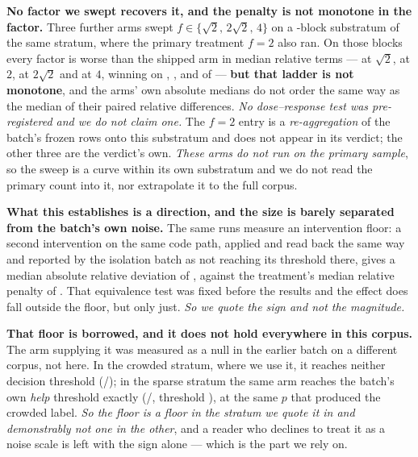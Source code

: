 \documentclass[review]{elsarticle}
\begin{document}
\textbf{No factor we swept recovers it, and the penalty is not monotone in the
factor.} Three further arms swept $f \in \{\sqrt{2},\, 2\sqrt{2},\, 4\}$ on a
\TFifteenDoseN{}-block substratum of the same stratum, where the primary treatment
$f = 2$ also ran. On those \TFifteenDoseN{} blocks every factor is worse than the
shipped arm in median relative terms --- \TFifteenSweepLoRel{} at $\sqrt{2}$,
\TFifteenSubFTwoRel{} at $2$, \TFifteenSweepMidRel{} at $2\sqrt{2}$ and
\TFifteenDoseRel{} at $4$, winning on \TFifteenSweepLoWin{},
\TFifteenSubFTwoWin{}, \TFifteenSweepMidWin{} and \TFifteenDoseWin{} of
\TFifteenDoseN{} --- \textbf{but that ladder is not monotone}, and the arms' own
absolute medians do not order the same way as the median of their paired relative
differences. \emph{No dose--response test was pre-registered and we do not claim
one.} The $f = 2$ entry is a \emph{re-aggregation} of the batch's frozen rows onto
this substratum and does not appear in its verdict; the other three are the verdict's
own. \emph{These arms do not run on the primary sample}, so the sweep is a curve
within its own substratum and we do not read the primary count into it, nor
extrapolate it to the full corpus.

\textbf{What this establishes is a direction, and the size is barely separated from
the batch's own noise.} The same runs measure an intervention floor: a second
intervention on the same code path, applied and read back the same way and reported
by the isolation batch as not reaching its threshold there, gives a median absolute
relative deviation of \TFifteenFloor{}, against the treatment's median relative
penalty of \TFifteenRel{}. That equivalence test was fixed before the results and the
effect does fall outside the floor, but only just. \emph{So we quote the sign and not
the magnitude.}

\textbf{That floor is borrowed, and it does not hold everywhere in this corpus.} The
arm supplying it was measured as a null in the earlier batch on a different corpus,
not here. In the crowded stratum, where we use it, it reaches neither decision
threshold (\TFifteenFloorCrowdedWin{}/\TFifteenN{}); in the sparse stratum the same
arm reaches the batch's own \emph{help} threshold exactly
(\TFifteenFloorSparseWin{}/\TFifteenN{}, threshold \TFifteenHelpThresh{}), at the
same $p$ that produced the crowded label. \emph{So the floor is a floor in the
stratum we quote it in and demonstrably not one in the other}, and a reader who
declines to treat it as a noise scale is left with the sign alone --- which is the
part we rely on.
\end{document}
